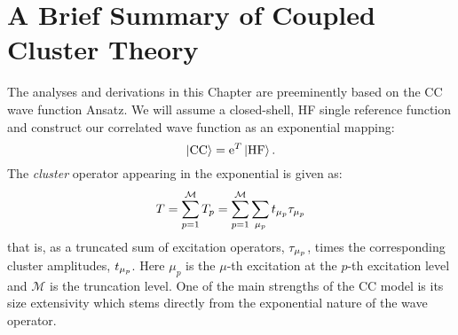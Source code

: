 \pagebreak

\section{A Brief Summary of Coupled Cluster Theory}

The analyses and derivations in this Chapter are preeminently based
on the \acl{CC} wave function Ansatz.
We will assume a closed-shell, \acs{HF} single reference function and
construct our correlated wave function as an exponential mapping:
\begin{equation}
  \ket{\mathrm{CC}} = \mathrm{e}^{T}\ket{\mathrm{HF}}.
\end{equation}
The \emph{cluster} operator appearing in the exponential is given as:
\begin{equation}
  T = \sum_{p=1}^\mathcal{M} T_p = \sum_{p=1}^\mathcal{M}\sum_{\mu_p}t_{\mu_p}\tau_{\mu_p}
\end{equation}
that is, as a truncated sum of excitation operators, $\tau_{\mu_p}$,
times the corresponding cluster amplitudes, $t_{\mu_p}$.
Here $\mu_p$ is the $\mu$-th excitation at the $p$-th excitation level and
$\mathcal{M}$ is the truncation level.
One of the main strengths of the \acs{CC} model is its size extensivity
which stems directly from the exponential nature of the wave
operator.~\autocite{Shavitt2009-mr, Helgaker2000-tz}

